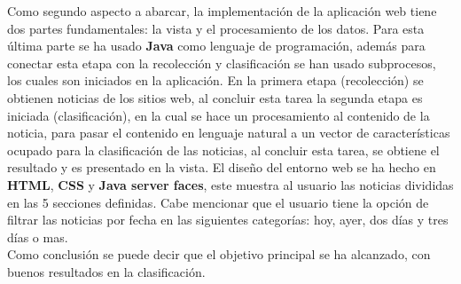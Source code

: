 Como segundo aspecto a abarcar, la implementación de la aplicación web tiene dos partes fundamentales: la vista  y el procesamiento de los datos. Para esta última parte se ha usado \textbf{Java} como lenguaje de programación, además para conectar esta etapa con la recolección y clasificación se han usado subprocesos, los cuales son iniciados en la aplicación. En la primera etapa (recolección) se obtienen noticias de los sitios web, al concluir esta tarea la segunda etapa es iniciada (clasificación), en la cual se hace un procesamiento al contenido de la noticia, para pasar el contenido en lenguaje natural a un vector de características ocupado para la clasificación de las noticias, al concluir esta tarea, se obtiene el resultado y es presentado en la vista. El diseño del entorno web se ha hecho en  \textbf{HTML}, \textbf{CSS} y \textbf{Java server faces}, este muestra al usuario las noticias divididas en las 5 secciones definidas. Cabe mencionar que el usuario tiene la opción de filtrar las noticias por fecha en las siguientes categorías: hoy, ayer, dos días y tres días o mas.\\

Como conclusión se puede decir que el objetivo principal se ha alcanzado, con buenos resultados en la clasificación.



%

%
